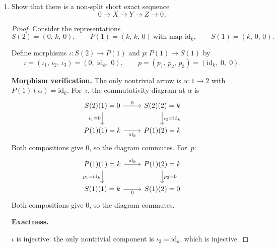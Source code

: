 \documentclass[11pt, a4paper]{article}
\begin{document}
\begin{enumerate}[leftmargin=*, label=\textbf{\arabic*.}]
\begin{enumerate}[label=(\alph*)]
\begin{proof}
    \medskip\noindent\textbf{Map at arrow $3\to 2$.}
    In the direct sum, the map $k \to k^3$ sends
    \[
    c \longmapsto \bigl(I(2)(\beta)(c),\; 0,\; 0\bigr) = (c,\,0,\,0),
    \]
    since $I(2)$ has identity map at this arrow, and $P(1)(3)=S(2)(3)=0$ contribute nothing. In matrix form this gives
    \[
    \begin{pmatrix} 1 \\ 0 \\ 0 \end{pmatrix},
    \]
    which agrees with the map of $M$. Therefore $M \cong I(2) \oplus P(1) \oplus S(2)$.
    \end{proof}
    \item Show that there is a non-split short exact sequence
    \[
        0 \longrightarrow X \longrightarrow Y \longrightarrow Z \longrightarrow 0\,.
    \]
    \begin{proof}
    Consider the representations
    \[
    S(2) = (0,\,k,\,0),\qquad P(1) = (k,\,k,\,0)\ \text{with map } \mathrm{id}_k,\qquad S(1) = (k,\,0,\,0).
    \]
    
    Define morphisms $\iota\colon S(2)\to P(1)$ and $p\colon P(1)\to S(1)$ by
    \[
    \iota = (\iota_1,\,\iota_2,\,\iota_3) = (0,\;\mathrm{id}_k,\;0),\qquad p = (p_1,\,p_2,\,p_3) = (\mathrm{id}_k,\;0,\;0).
    \]
    
    \medskip\noindent\textbf{Morphism verification.}
    The only nontrivial arrow is $\alpha\colon 1\to 2$ with $P(1)(\alpha)=\mathrm{id}_k$. For~$\iota$, the commutativity diagram at $\alpha$ is
    \[
    \begin{tikzcd}
    S(2)(1) = 0 \arrow[r, "0"] \arrow[d, "\iota_1=0"'] & S(2)(2) = k \arrow[d, "\iota_2=\mathrm{id}_k"] \\
    P(1)(1) = k \arrow[r, "\mathrm{id}_k"'] & P(1)(2) = k
    \end{tikzcd}
    \]
    Both compositions give $0$, so the diagram commutes. For~$p$:
    \[
    \begin{tikzcd}
    P(1)(1) = k \arrow[r, "\mathrm{id}_k"] \arrow[d, "p_1=\mathrm{id}_k"'] & P(1)(2) = k \arrow[d, "p_2=0"] \\
    S(1)(1) = k \arrow[r, "0"'] & S(1)(2) = 0
    \end{tikzcd}
    \]
    Both compositions give $0$, so the diagram commutes.
    
    \medskip\noindent\textbf{Exactness.}
    
    $\iota$ is injective: the only nontrivial component is $\iota_2=\mathrm{id}_k$, which is injective.
    

\end{proof}
\end{enumerate}
\end{enumerate}
\end{document}
